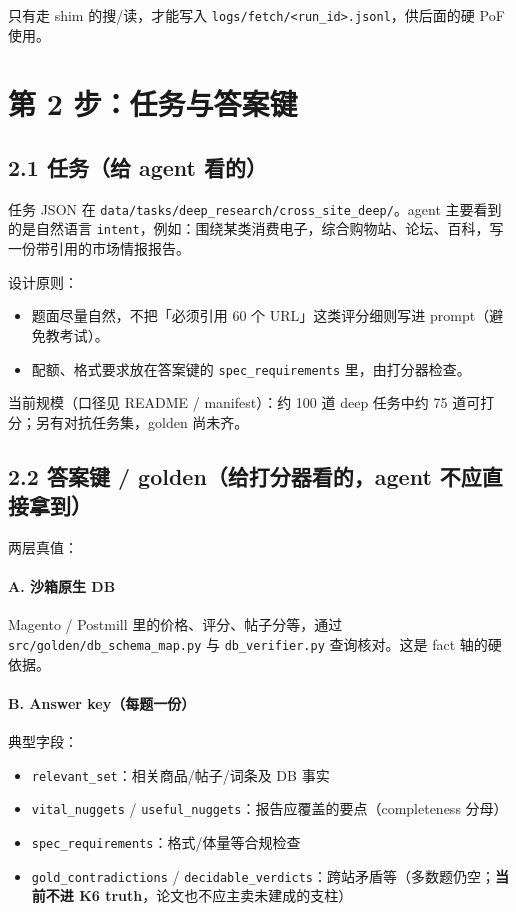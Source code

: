 \documentclass[11pt,a4paper]{article}
\begin{document}
只有走 shim 的搜/读，才能写入 \texttt{logs/fetch/<run\_id>.jsonl}，供后面的硬 PoF 使用。

\section{第 2 步：任务与答案键}

\subsection{2.1 任务（给 agent 看的）}

任务 JSON 在 \texttt{data/tasks/deep\_research/cross\_site\_deep/}。agent 主要看到的是自然语言 \texttt{intent}，例如：围绕某类消费电子，综合购物站、论坛、百科，写一份带引用的市场情报报告。

设计原则：
\begin{itemize}[leftmargin=1.5em]
  \item 题面尽量自然，不把「必须引用 60 个 URL」这类评分细则写进 prompt（避免教考试）。
  \item 配额、格式要求放在答案键的 \texttt{spec\_requirements} 里，由打分器检查。
\end{itemize}

当前规模（口径见 README / manifest）：约 100 道 deep 任务中约 75 道可打分；另有对抗任务集，golden 尚未齐。

\subsection{2.2 答案键 / golden（给打分器看的，agent 不应直接拿到）}

两层真值：

\paragraph{A. 沙箱原生 DB}
Magento / Postmill 里的价格、评分、帖子分等，通过 \texttt{src/golden/db\_schema\_map.py} 与 \texttt{db\_verifier.py} 查询核对。这是 fact 轴的硬依据。

\paragraph{B. Answer key（每题一份）}
典型字段：
\begin{itemize}[leftmargin=1.5em]
  \item \texttt{relevant\_set}：相关商品/帖子/词条及 DB 事实
  \item \texttt{vital\_nuggets} / \texttt{useful\_nuggets}：报告应覆盖的要点（completeness 分母）
  \item \texttt{spec\_requirements}：格式/体量等合规检查
  \item \texttt{gold\_contradictions} / \texttt{decidable\_verdicts}：跨站矛盾等（多数题仍空；\textbf{当前不进 K6 truth}，论文也不应主卖未建成的支柱）
\end{itemize}
\end{document}
